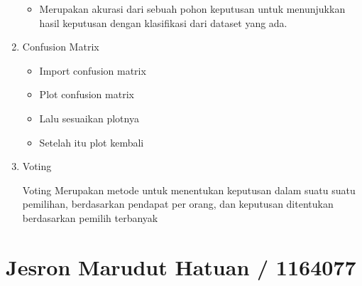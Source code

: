 \begin{enumerate}
\begin{itemize}
\item Merupakan akurasi dari sebuah pohon keputusan untuk menunjukkan hasil keputusan dengan klasifikasi dari dataset yang ada.
\end{itemize}
\item Confusion Matrix
\begin{itemize}
\item Import confusion matrix
\item Plot confusion matrix
\item Lalu sesuaikan plotnya
\item Setelah itu plot kembali
\end{itemize}
\item Voting
\par
Voting Merupakan metode untuk menentukan keputusan dalam suatu suatu pemilihan, berdasarkan pendapat per orang, dan keputusan ditentukan berdasarkan pemilih terbanyak
\end{enumerate}

\section {Jesron Marudut Hatuan / 1164077}

